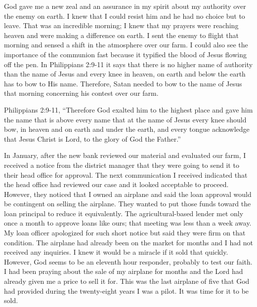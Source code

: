 \documentclass[oneside]{book}
\begin{document}
God gave me a new zeal and an assurance in my spirit about my authority over the enemy on earth. I knew that I could resist him and he had no choice but to leave. That was an incredible morning; I knew that my prayers were reaching heaven and were making a difference on earth. I sent the enemy to flight that morning and sensed a shift in the atmosphere over our farm. I could also see the importance of the communion fast because it typified the blood of Jesus flowing off the pen. In Philippians 2:9-11 it says that there is no higher name of authority than the name of Jesus and every knee in heaven, on earth and below the earth has to bow to His name. Therefore, Satan needed to bow to the name of Jesus that morning concerning his contest over our farm. 

Philippians 2:9-11, “Therefore God exalted him to the highest place and gave him the name that is above every name that at the name of Jesus every knee should bow, in heaven and on earth and under the earth, and every tongue acknowledge that Jesus Christ is Lord, to the glory of God the Father.”

In January, after the new bank reviewed our material and evaluated our farm, I received a notice from the district manager that they were going to send it to their head office for approval. The next communication I received indicated that the head office had reviewed our case and it looked acceptable to proceed. However, they noticed that I owned an airplane and said the loan approval would be contingent on selling the airplane. They wanted to put those funds toward the loan principal to reduce it equivalently. The agricultural-based lender met only once a month to approve loans like ours; that meeting was less than a week away. My loan officer apologized for such short notice but said they were firm on that condition. The airplane had already been on the market for months and I had not received any inquiries. I knew it would be a miracle if it sold that quickly. However, God seems to be an eleventh hour responder, probably to test our faith. I had been praying about the sale of my airplane for months and the Lord had already given me a price to sell it for. This was the last airplane of five that God had provided during the twenty-eight years I was a pilot. It was time for it to be sold.
\end{document}
